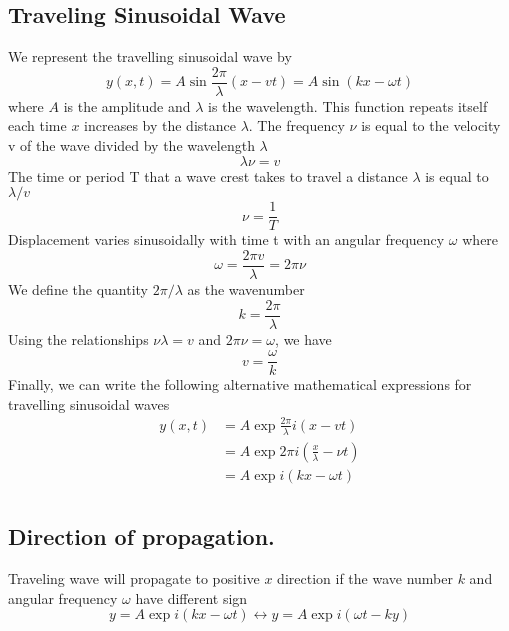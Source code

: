 \documentclass[../../../main.tex]{subfiles}
\begin{document}
\subsection*{Traveling Sinusoidal Wave}
We represent the travelling sinusoidal wave by
\begin{equation*}
    y(x, t) = A\sin \frac{2\pi  }{\lambda} (x-vt)=A \sin(kx - \omega t)
\end{equation*}
where $A$ is the amplitude and $\lambda$ is the wavelength. This function repeats itself each time $x$ increases by the distance $\lambda$. The frequency $\nu$ is equal to the velocity v of the
wave divided by the wavelength $\lambda$
\begin{equation*}
    \lambda \nu = v 
\end{equation*}
The time or period T that a wave crest takes to travel a distance $\lambda$ is equal to $\lambda/v$
\begin{equation*}
    \nu=\frac{1}{T}
\end{equation*}
Displacement varies sinusoidally with time t with an angular frequency $\omega$ where
\begin{equation*}
    \omega=\frac{2\pi v}{\lambda}=2\pi \nu
\end{equation*}
We define the quantity $2\pi/\lambda$ as the wavenumber
\begin{equation*}
    k=\frac{2\pi}{\lambda}
\end{equation*}
Using the relationships $\nu\lambda = v$ and $2\pi\nu = \omega$, we have
\begin{equation*}
    v=\frac{\omega}{k}
\end{equation*}
Finally, we can write the following alternative mathematical expressions for travelling sinusoidal waves
\begin{align*}
    y(x,t)&=A\exp \frac{2\pi  }{\lambda}i (x-vt)\\
    &=A\exp 2\pi i (\frac{x}{\lambda}-\nu t)\\
    &=A\exp i (kx-\omega t)\\
\end{align*}

\subsection*{Direction of propagation.} Traveling wave will propagate to positive $x$ direction if the wave number $k$ and angular frequency $\omega$ have different sign
\begin{equation*}
    y=A\exp i (kx-\omega t)\longleftrightarrow y=A\exp i (\omega t-ky)
\end{equation*}
\end{document}
